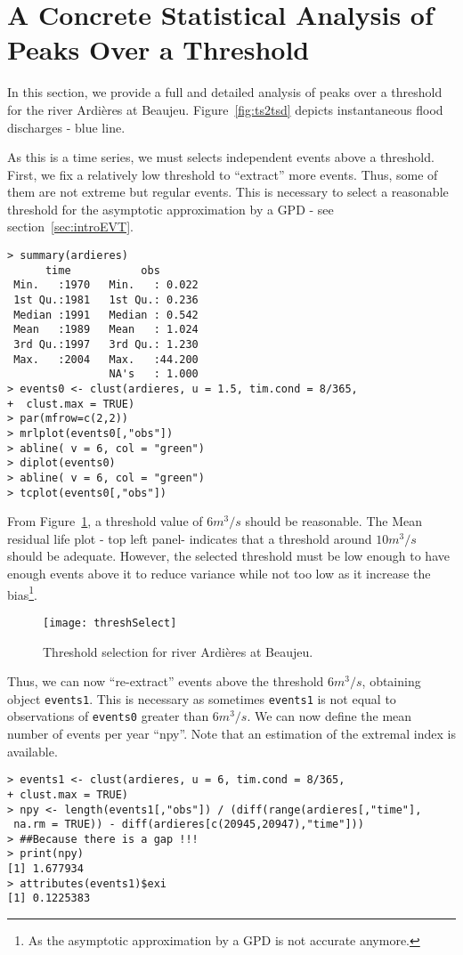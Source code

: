 \documentclass[11pt,a4paper]{article}
\numberwithin{equation}{section}
\begin{document}
\section{A Concrete Statistical Analysis of Peaks Over a Threshold}
\label{sec:concAn}

In this section, we provide a full and detailed analysis of peaks over
a threshold for the river Ardi\`eres at
Beaujeu. Figure~\ref{fig:ts2tsd} depicts instantaneous flood
discharges - blue line.

As this is a time series, we must selects independent events above a
threshold. First, we fix a relatively low threshold to ``extract''
more events. Thus, some of them are not extreme but regular
events. This is necessary to select a reasonable threshold for the
asymptotic approximation by a GPD - see section~\ref{sec:introEVT}.
\begin{verbatim}
> summary(ardieres)
      time           obs        
 Min.   :1970   Min.   : 0.022  
 1st Qu.:1981   1st Qu.: 0.236  
 Median :1991   Median : 0.542  
 Mean   :1989   Mean   : 1.024  
 3rd Qu.:1997   3rd Qu.: 1.230  
 Max.   :2004   Max.   :44.200  
                NA's   : 1.000  
> events0 <- clust(ardieres, u = 1.5, tim.cond = 8/365,
+  clust.max = TRUE)
> par(mfrow=c(2,2))
> mrlplot(events0[,"obs"])
> abline( v = 6, col = "green")
> diplot(events0)
> abline( v = 6, col = "green")
> tcplot(events0[,"obs"])
\end{verbatim}
From Figure~\ref{fig:threshSelect}, a threshold value of $6 m^3/s$
should be reasonable. The Mean residual life plot - top left panel-
indicates that a threshold around $10 m^3/s$ should be
adequate. However, the selected threshold must be low enough to have
enough events above it to reduce variance while not too low as it
increase the bias\footnote{As the asymptotic approximation by a GPD is
  not accurate anymore.}.

\begin{figure}
  \centering
  \texttt{[image: threshSelect]}
  \caption{Threshold selection for river Ardi\`eres at Beaujeu.}
  \label{fig:threshSelect}
\end{figure}

Thus, we can now ``re-extract'' events above the threshold $6 m^3/s$,
obtaining object \verb|events1|. This is necessary as sometimes
\verb|events1| is not equal to observations of \verb|events0| greater
than $6 m^3/s$. We can now define the mean number of events per year
``npy''. Note that an estimation of the extremal index is available.
\begin{verbatim}
> events1 <- clust(ardieres, u = 6, tim.cond = 8/365,
+ clust.max = TRUE)
> npy <- length(events1[,"obs"]) / (diff(range(ardieres[,"time"],
 na.rm = TRUE)) - diff(ardieres[c(20945,20947),"time"]))
> ##Because there is a gap !!!
> print(npy)
[1] 1.677934
> attributes(events1)$exi
[1] 0.1225383
\end{verbatim}
\end{document}

